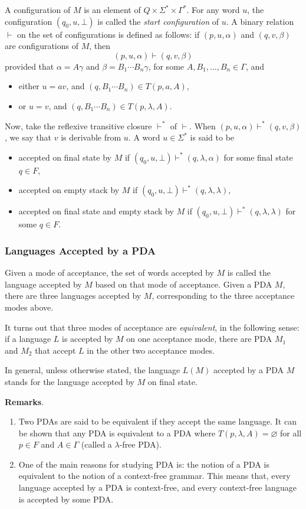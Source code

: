 \documentclass[12pt]{article}
\begin{document}
A configuration of $M$ is an element of $Q\times \Sigma^* \times \Gamma^*$.  For any word $u$, the configuration $(q_0,u,\bot)$ is called the \emph{start configuration} of $u$.  A binary relation $\vdash$ on the set of configurations is defined as follows: if $(p,u,\alpha)$ and $(q,v,\beta)$ are configurations of $M$, then $$(p,u,\alpha)\vdash (q,v,\beta)$$ provided that $\alpha=A\gamma$ and $\beta=B_1\cdots B_n\gamma$, for some $A,B_1,\ldots, B_n \in \Gamma$, and
\begin{itemize}
\item either $u=av$, and $(q,B_1\cdots B_n)\in T(p,a,A)$,
\item or $u=v$, and $(q,B_1\cdots B_n)\in T(p,\lambda,A)$.
\end{itemize}
Now, take the reflexive transitive closure $\vdash^*$ of $\vdash$.  When $(p,u,\alpha) \vdash^* (q,v,\beta)$, we say that $v$ is derivable from $u$.  A word $u \in\Sigma^*$ is said to be 
\begin{itemize}
\item accepted on final state by $M$ if $(q_0,u,\bot) \vdash^* (q,\lambda,\alpha)$ for some final state $q\in F$,
\item accepted on empty stack by $M$ if $(q_0,u,\bot) \vdash^* (q,\lambda,\lambda)$,
\item accepted on final state and empty stack by $M$ if $(q_0,u,\bot) \vdash^* (q,\lambda,\lambda)$ for some $q\in F$.
\end{itemize}

\subsubsection*{Languages Accepted by a PDA}

Given a mode of acceptance, the set of words accepted by $M$ is called the language accepted by $M$ based on that mode of acceptance.  Given a PDA $M$, there are three languages accepted by $M$, corresponding to the three acceptance modes above.

It turns out that three modes of acceptance are \emph{equivalent}, in the following sense: if a language $L$ is accepted by $M$ on one acceptance mode, there are PDA $M_1$ and $M_2$ that accept $L$ in the other two acceptance modes.  

In general, unless otherwise stated, the language $L(M)$ accepted by a PDA $M$ stands for the language accepted by $M$ on final state.

\textbf{Remarks}.
\begin{enumerate}
\item
Two PDAs are said to be equivalent if they accept the same language.  It can be shown that any PDA is equivalent to a PDA where $T(p,\lambda,A)=\varnothing$ for all $p\in F$ and $A\in \Gamma$ (called a $\lambda$-free PDA).
\item
One of the main reasons for studying PDA is: the notion of a PDA is equivalent to the notion of a context-free grammar.  This means that, every language accepted by a PDA is context-free, and every context-free language is accepted by some PDA.
\end{enumerate}
\end{document}
